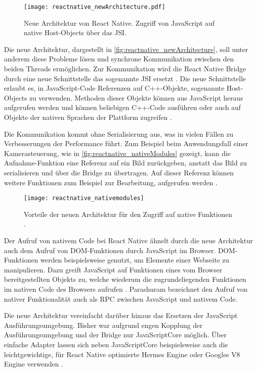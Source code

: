 \begin{figure}[ht]
  \centering
  \texttt{[image: reactnative\_newArchitecture.pdf]}
  \caption{Neue Architektur von React Native. Zugriff von JavaScript auf native Host-Objects über das \ac{JSI}.}
  \label{fig:reactnative_newArchitecture}
\end{figure}
Die neue Architektur, dargestellt in \autoref{fig:reactnative_newArchitecture}, soll unter anderem diese Probleme lösen und synchrone Kommunikation zwischen den beiden Threads ermöglichen.
Zur Kommunikation wird die React Native Bridge durch eine neue Schnittstelle das sogenannte \ac{JSI} ersetzt \cite{Cook_ReactNativeBridge}.
Die neue Schnittstelle erlaubt es, in JavaScript-Code Referenzen auf C++-Objekte, sogenannte Host-Objects zu verwenden.
Methoden dieser Objekte können aus JavaScript heraus aufgerufen werden und können beliebigen C++-Code ausführen oder auch auf Objekte der nativen Sprachen der Plattform zugreifen \cite{Parashuram_React}.

Die Kommunikation kommt ohne Serialisierung aus, was in vielen Fällen zu Verbesserungen der Performance führt.
Zum Beispiel beim Anwendungsfall einer Kamerasteuerung, wie in \autoref{fig:reactnative_nativeModules} gezeigt, kann die Aufnahme-Funktion eine Referenz auf ein Bild zurückgeben, anstatt das Bild zu serialisieren und über die Bridge zu übertragen.
Auf dieser Referenz können weitere Funktionen zum Beispiel zur Bearbeitung, aufgerufen werden \cite{Parashuram_React}.
\begin{figure}[ht]
  \centering
  \texttt{[image: reactnative\_nativemodules]}
  \caption{Vorteile der neuen Architektur für den Zugriff auf native Funktionen \cite{Parashuram_React}.}
  \label{fig:reactnative_nativeModules}  
\end{figure}
Der Aufruf von nativem Code bei React Native ähnelt durch die neue Architektur auch dem Aufruf von \ac{DOM}-Funktionen durch JavaScript im Browser.
\ac{DOM}-Funktionen werden beispielsweise genutzt, um Elemente einer Webseite zu manipulieren.
Dazu greift JavaScript auf Funktionen eines vom Browser bereitgestellten Objekts zu, welche wiederum die zugrundeliegenden Funktionen im nativen Code des Browsers aufrufen \cite{ReactNative_newArchitecture}.
Parashuram \cite{Parashuram_React} bezeichnet den Aufruf von nativer Funktionalität auch als \ac{RPC} zwischen JavaScript und nativem Code.

Die neue Architektur vereinfacht darüber hinaus das Ersetzen der JavaScript Ausführungsumgebung.
Bisher war aufgrund engen Kopplung der Ausführungsumgebung und der Bridge nur JavaScriptCore möglich.
Über einfache Adapter lassen sich neben JavaScriptCore beispielsweise auch die leichtgewichtige, für React Native optimierte Hermes Engine oder Googles V8 Engine verwenden \cite{Cook_ReactNativeBridge,JSI_Adapter}.


